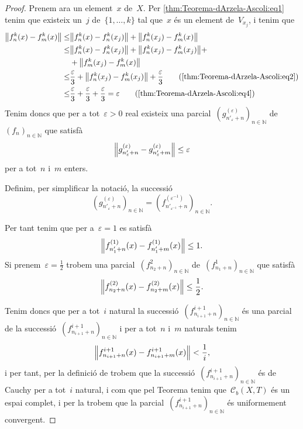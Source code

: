 \documentclass[../equacions-diferencials-I.tex]{subfiles}
\begin{document}
\begin{proof}
        Prenem ara un element~\(x\) de~\(X\).
        Per \eqref{thm:Teorema-dArzela-Ascoli:eq1} tenim que existeix un~\(j\) de~\(\{1,\dots,k\}\) tal que~\(x\) és un element de~\(V_{x_{j}}\), i tenim que
        \begin{align*}
            \norm{f^{k}_{n}(x)-f^{k}_{m}(x)}\leq&\norm{f^{k}_{n}(x)-f^{k}_{n}(x_{j})}+\norm{f^{k}_{n}(x_{j})-f^{k}_{m}(x)} \\
            \leq&\norm{f^{k}_{n}(x)-f^{k}_{n}(x_{j})}+\norm{f^{k}_{n}(x_{j})-f^{k}_{m}(x_{j})}+\\&+\norm{f^{k}_{m}(x_{j})-f^{k}_{m}(x)} \\
            \leq&\frac{\varepsilon}{3}+\norm{f^{k}_{n}(x_{j})-f^{k}_{m}(x_{j})}+\frac{\varepsilon}{3}\tag{\ref{thm:Teorema-dArzela-Ascoli:eq2}} \\
            \leq&\frac{\varepsilon}{3}+\frac{\varepsilon}{3}+\frac{\varepsilon}{3}=\varepsilon\tag{\ref{thm:Teorema-dArzela-Ascoli:eq4}}
        \end{align*}
        Tenim doncs que per a tot~\(\varepsilon>0\) real existeix una parcial~\((g^{(\varepsilon)}_{n'_{\varepsilon}+n})_{n\in\mathbb{N}}\) de~\((f_{n})_{n\in\mathbb{N}}\) que satisfà
        \[
            \norm{g^{(\varepsilon)}_{n'_{\varepsilon}+n}-g^{(\varepsilon)}_{n'_{\varepsilon}+m}}\leq\varepsilon
        \]
        per a tot~\(n\) i~\(m\) enters.

        Definim, per simplificar la notació, la successió
        \[
            \left(g^{(\varepsilon)}_{n'_{\varepsilon}+n}\right)_{n\in\mathbb{N}}=\left(f^{(\varepsilon^{-1})}_{n'_{\varepsilon^{-1}}+n}\right)_{n\in\mathbb{N}}.
        \]

        Per tant tenim que per a~\(\varepsilon=1\) es satisfà
        \[
            \norm{f^{(1)}_{n'_{1}+n}(x)-f^{(1)}_{n'_{1}+m}(x)}\leq1.
        \]
        Si prenem~\(\varepsilon=\frac{1}{2}\) trobem una parcial~\((f^{2}_{n_{2}+n})_{n\in\mathbb{N}}\) de~\((f^{1}_{n_{1}+n})_{n\in\mathbb{N}}\) que satisfà
        \[
            \norm{f^{(2)}_{n_{2}+n}(x)-f^{(2)}_{n_{2}+m}(x)}\leq\frac{1}{2}.
        \]

        Tenim doncs que per a tot~\(i\) natural la successió~\((f^{i+1}_{n_{i+1}+n})_{n\in\mathbb{N}}\) és una parcial de la successió~\((f^{i+1}_{n_{i+1}+n})_{n\in\mathbb{N}}\) i per a tot~\(n\) i~\(m\) naturals tenim
        \[
            \norm{f^{i+1}_{n_{i+1}+n}(x)-f^{i+1}_{n_{i+1}+m}(x)}<\frac{1}{i},
        \]
        i per tant, per la definició de  trobem que la successió~\((f^{i+1}_{n_{i+1}+n})_{n\in\mathbb{N}}\) és de Cauchy per a tot~\(i\) natural, i com que pel Teorema  tenim que~\(\mathcal{C}_{b}(X,T)\) és un espai complet, i per la  trobem que la parcial~\((f^{i+1}_{n_{i+1}+n})_{n\in\mathbb{N}}\) és uniformement convergent.
    \end{proof}
\end{document}
